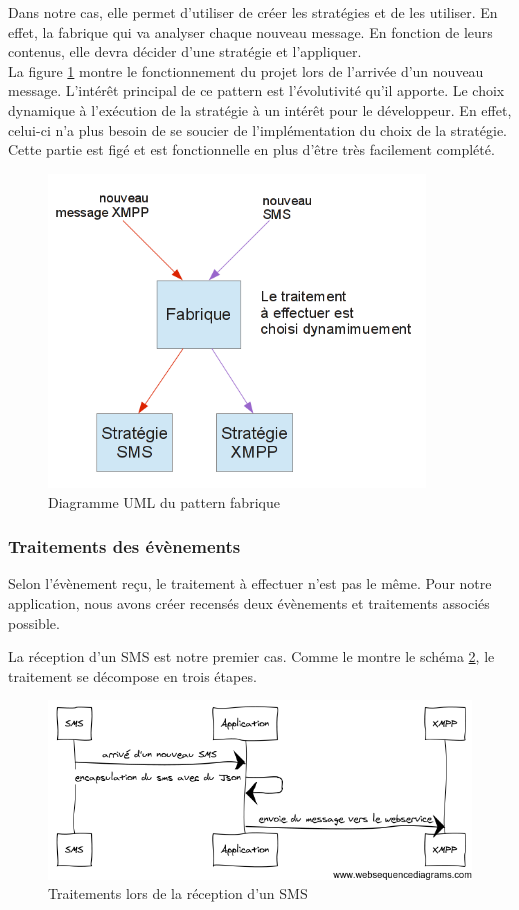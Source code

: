 Dans notre cas, elle permet d'utiliser de créer les stratégies et de les utiliser. En effet, la fabrique 
qui va analyser chaque nouveau message. En fonction de leurs contenus, elle devra décider d'une stratégie
et l'appliquer.
\\

La figure \ref{fonctionnement-strategie-factorie} montre le fonctionnement du projet lors de l'arrivée d'un
nouveau message. L'intérêt principal de ce pattern est l'évolutivité qu'il apporte. Le choix dynamique à
l'exécution de la stratégie à un intérêt pour le développeur. En effet, celui-ci n'a plus besoin de se
soucier de l'implémentation du choix de la stratégie. Cette partie est figé et est fonctionnelle en plus d'être très facilement complété.

\begin{figure}[H]
	\center
	\includegraphics[width=10cm]{img/fonctionnement-strategie-factorie.png}
	\caption{Diagramme UML du pattern fabrique}
	\label{fonctionnement-strategie-factorie}
\end{figure}


\subsubsection{Traitements des évènements}

Selon l'évènement reçu, le traitement à effectuer n'est pas le même. Pour notre application, nous avons 
créer recensés deux évènements et traitements associés possible.

La réception d'un SMS est notre premier cas. Comme le montre le schéma \ref{encapsulation-sms}, le traitement se 
décompose en trois étapes. 

\begin{figure}[!h]
	\center
	\includegraphics[width=12cm]{img/encapsulation-sms.png}
	\caption{Traitements lors de la réception d'un SMS}
	\label{encapsulation-sms}
\end{figure}

